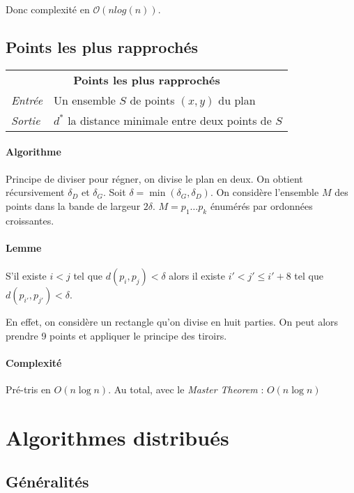 \documentclass[french]{article}
\begin{document}
Donc complexité en $\mathcal{O}(n log(n))$.

\subsection{Points les plus rapprochés}

\vspace{0.5cm}
\begin{tabularx}{\textwidth}{p{1cm}X}
\multicolumn{2}{c}{\textbf{Points les plus rapprochés}} \\ 
\emph{Entrée} & Un ensemble $S$ de points $(x,y)$ du plan \\ 
\emph{Sortie} & $d^*$ la distance minimale entre deux points de $S$ \\
\end{tabularx}

\paragraph{Algorithme}Principe de diviser pour régner, on divise le plan en deux. On obtient récursivement $\delta_D$ et $\delta_G$. Soit $\delta = \min (\delta_G, \delta_D)$. On considère l'ensemble $M$ des points dans la bande de largeur $2\delta$. $M = p_1 \ldots p_k$ énumérés par ordonnées croissantes.

\paragraph{Lemme}S'il existe $i < j$ tel que $d(p_i,p_j) < \delta$ alors il existe $i' < j' \leq i'+8$ tel que $d(p_{i'},p_{j'}) < \delta$.

En effet, on considère un rectangle qu'on divise en huit parties. On peut alors prendre 9 points et appliquer le principe des tiroirs.

\paragraph{Complexité} Pré-tris en $O(n \log n)$. Au total, avec le \emph{Master Theorem} : $O(n \log n)$

\section{Algorithmes distribués}

\subsection{Généralités}
\end{document}
